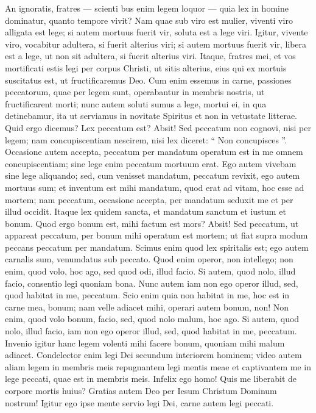 \begin{biblechapter}
\begin{biblechapter}
\begin{biblechapter}
\begin{biblechapter}
\begin{biblechapter}
\begin{biblechapter}
\begin{biblechapter}
\verse An ignoratis, fratres — scienti bus enim legem loquor — quia lex in homine dominatur, quanto tempore vivit? 
\verse Nam quae sub viro est mulier, viventi viro alligata est lege; si autem mortuus fuerit vir, soluta est a lege viri. 
\verse Igitur, vivente viro, vocabitur adultera, si fuerit alterius viri; si autem mortuus fuerit vir, libera est a lege, ut non sit adultera, si fuerit alterius viri. 
\verse Itaque, fratres mei, et vos mortificati estis legi per corpus Christi, ut sitis alterius, eius qui ex mortuis suscitatus est, ut fructificaremus Deo. 
\verse Cum enim essemus in carne, passiones peccatorum, quae per legem sunt, operabantur in membris nostris, ut fructificarent morti; 
\verse nunc autem soluti sumus a lege, mortui ei, in qua detinebamur, ita ut serviamus in novitate Spiritus et non in vetustate litterae.
 \verse Quid ergo dicemus? Lex peccatum est? Absit! Sed peccatum non cognovi, nisi per legem; nam concupiscentiam nescirem, nisi lex diceret: “ Non concupisces ”. 
\verse Occasione autem accepta, peccatum per mandatum operatum est in me omnem concupiscentiam; sine lege enim peccatum mortuum erat. 
\verse Ego autem vivebam sine lege aliquando; sed, cum venisset mandatum, peccatum revixit, 
\verse ego autem mortuus sum; et inventum est mihi mandatum, quod erat ad vitam, hoc esse ad mortem; 
\verse nam peccatum, occasione accepta, per mandatum seduxit me et per illud occidit. 
\verse Itaque lex quidem sancta, et mandatum sanctum et iustum et bonum. 
\verse Quod ergo bonum est, mihi factum est mors? Absit! Sed peccatum, ut appareat peccatum, per bonum mihi operatum est mortem; ut fiat supra modum peccans peccatum per mandatum.
 \verse Scimus enim quod lex spiritalis est; ego autem carnalis sum, venumdatus sub peccato. 
\verse Quod enim operor, non intellego; non enim, quod volo, hoc ago, sed quod odi, illud facio. 
\verse Si autem, quod nolo, illud facio, consentio legi quoniam bona. 
\verse Nunc autem iam non ego operor illud, sed, quod habitat in me, peccatum. 
\verse Scio enim quia non habitat in me, hoc est in carne mea, bonum; nam velle adiacet mihi, operari autem bonum, non! 
\verse Non enim, quod volo bonum, facio, sed, quod nolo malum, hoc ago. 
\verse Si autem, quod nolo, illud facio, iam non ego operor illud, sed, quod habitat in me, peccatum. 
\verse Invenio igitur hanc legem volenti mihi facere bonum, quoniam mihi malum adiacet. 
 \verse Condelector enim legi Dei secundum interiorem hominem; 
\verse video autem aliam legem in membris meis repugnantem legi mentis meae et captivantem me in lege peccati, quae est in membris meis.
 \verse Infelix ego homo! Quis me liberabit de corpore mortis huius? 
\verse Gratias autem Deo per Iesum Christum Dominum nostrum! Igitur ego ipse mente servio legi Dei, carne autem legi peccati.
 

\end{biblechapter}
\end{biblechapter}
\end{biblechapter}
\end{biblechapter}
\end{biblechapter}
\end{biblechapter}
\end{biblechapter}

